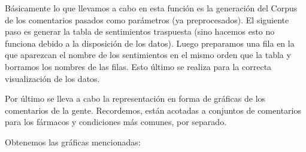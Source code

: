 \documentclass[spanish,]{article}
\newenvironment{Shaded}{\begin{snugshade}}{\end{snugshade}}
\newcommand{\KeywordTok}[1]{\textcolor[rgb]{0.13,0.29,0.53}{\textbf{#1}}}
\newcommand{\StringTok}[1]{\textcolor[rgb]{0.31,0.60,0.02}{#1}}
\newcommand{\ControlFlowTok}[1]{\textcolor[rgb]{0.13,0.29,0.53}{\textbf{#1}}}
\newcommand{\OperatorTok}[1]{\textcolor[rgb]{0.81,0.36,0.00}{\textbf{#1}}}
\newcommand{\NormalTok}[1]{#1}
\begin{document}
Básicamente lo que llevamos a cabo en esta función es la generación del
Corpus de los comentarios pasados como parámetros (ya preprocesados). El
siguiente paso es generar la tabla de sentimientos traspuesta (sino
hacemos esto no funciona debido a la disposición de los datos). Luego
preparamos una fila en la que aparezcan el nombre de los sentimientos en
el mismo orden que la tabla y borramos los nombres de las filas. Esto
último se realiza para la correcta visualización de los datos.

Por último se lleva a cabo la representación en forma de gráficas de los
comentarios de la gente. Recordemos, están acotadas a conjuntos de
comentarios para los fármacos y condiciones más comunes, por separado.

Obtenemos las gráficas mencionadas:

\begin{Shaded}
\end{Shaded}

\begin{Shaded}
\end{Shaded}

\begin{Shaded}
\end{Shaded}
\end{document}
